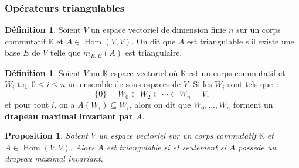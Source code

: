 \documentclass{article}
\DeclareMathOperator{\tq}{\text{ t.q. }}
\DeclareMathOperator{\Hom}{Hom}
\newcommand{\K}{\mathbb K}
\newtheorem{prp}[thm]{Proposition}
\theoremstyle{definition}
\newtheorem{déf}[thm]{Définition}
\theoremstyle{remark}
\begin{document}
		\subsubsection{Opérateurs triangulables}
		\begin{déf} Soient $V$ un espace vectoriel de dimension finie $n$ sur un corps commutatif $\K$ et $A \in \Hom(V, V)$. On dit que $A$ est triangulable
		s'il existe une base $E$ de $V$ telle que $m_{E, E}(A)$ est triangulaire. \end{déf}

		\begin{déf} Soient $V$ un $\K$-espace vectoriel où $\K$ est un corps commutatif et ${W_i \tq 0 \leq i \leq n}$ un ensemble de sous-espaces de $V$.
		Si les $W_i$ sont tels que~:
		\[\{0\} = W_0 \subset W_2 \subset \dotsb \subset W_n = V,\]
		et pour tout $i$, on a $A(W_i) \subseteq W_i$, alors on dit que $W_0, \dotsc, W_n$ forment un \textbf{drapeau maximal invariant par $A$}. \end{déf}

		\begin{prp} Soient $V$ un espace vectoriel sur un corps commutatif $\K$ et $A \in \Hom(V, V)$. Alors $A$ est triangulable si et seulement si
		$A$ possède un drapeau maximal invariant. \end{prp}
\end{document}
